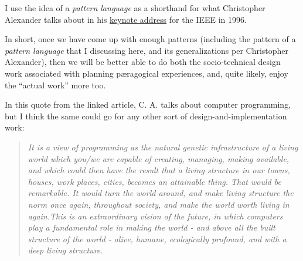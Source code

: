 I use the idea of a \emph{pattern language} as a shorthand for what
Christopher Alexander talks about in his
\href{http://www.patternlanguage.com/archive/ieee/ieeetext.htm}{keynote
address} for the IEEE in 1996.

In short, once we have come up with enough patterns (including the
pattern of a \emph{pattern language} that I discussing here, and its
generalizations per Christopher Alexander), then we will be better able
to do both the socio-technical design work associated with planning
pæragogical experiences, and, quite likely, enjoy the ``actual work''
more too.

In this quote from the linked article, C. A. talks about computer
programming, but I think the same could go for any other sort of
design-and-implementation work:

\begin{quote}
\emph{It is a view of programming as the natural genetic infrastructure
of a living world which you/we are capable of creating, managing, making
available, and which could then have the result that a living structure
in our towns, houses, work places, cities, becomes an attainable thing.
That would be remarkable. It would turn the world around, and make
living structure the norm once again, throughout society, and make the
world worth living in again.This is an extraordinary vision of the
future, in which computers play a fundamental role in making the world -
and above all the built structure of the world - alive, humane,
ecologically profound, and with a deep living structure.}
\end{quote}
